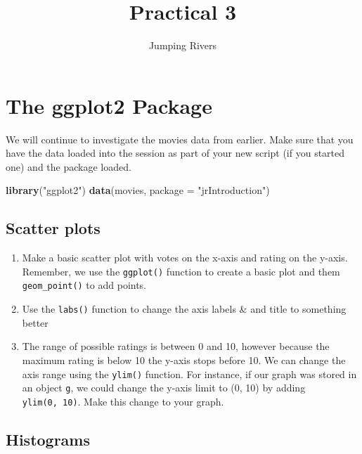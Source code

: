 \documentclass[]{tufte-handout}
\title{Practical 3}
\author{Jumping Rivers}
\date{}
\newenvironment{Shaded}{}{}
\newcommand{\DataTypeTok}[1]{\textcolor[rgb]{0.56,0.13,0.00}{#1}}
\newcommand{\KeywordTok}[1]{\textcolor[rgb]{0.00,0.44,0.13}{\textbf{#1}}}
\newcommand{\NormalTok}[1]{#1}
\newcommand{\StringTok}[1]{\textcolor[rgb]{0.25,0.44,0.63}{#1}}
\begin{document}
\maketitle




\hypertarget{the-ggplot2-package}{%
\section{The ggplot2 Package}\label{the-ggplot2-package}}

We will continue to investigate the movies data from earlier. Make sure
that you have the data loaded into the session as part of your new
script (if you started one) and the package loaded.

\begin{Shaded}
\begin{Highlighting}[]
\KeywordTok{library}\NormalTok{(}\StringTok{"ggplot2"}\NormalTok{)}
\KeywordTok{data}\NormalTok{(movies, }\DataTypeTok{package =} \StringTok{"jrIntroduction"}\NormalTok{)}
\end{Highlighting}
\end{Shaded}

\hypertarget{scatter-plots}{%
\subsection{Scatter plots}\label{scatter-plots}}

\begin{enumerate}
\def\labelenumi{\arabic{enumi}.}
\item
  Make a basic scatter plot with votes on the x-axis and rating on the
  y-axis. Remember, we use the \texttt{ggplot()} function to create a
  basic plot and them \texttt{geom\_point()} to add points.
\item
  Use the \texttt{labs()} function to change the axis labels \& and
  title to something better
\item
  The range of possible ratings is between 0 and 10, however because the
  maximum rating is below 10 the y-axis stops before 10. We can change
  the axis range using the \texttt{ylim()} function. For instance, if
  our graph was stored in an object \texttt{g}, we could change the
  y-axis limit to (0, 10) by adding \texttt{ylim(0,\ 10)}. Make this
  change to your graph.
\end{enumerate}

\hypertarget{histograms}{%
\subsection{Histograms}\label{histograms}}
\end{document}
